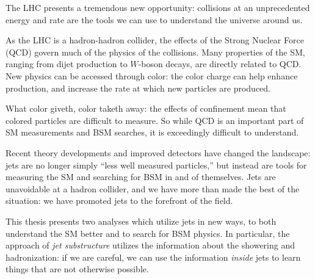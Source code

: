 \label{chapter:introduction}


The LHC presents a tremendous new opportunity: collisions at an unprecedented energy and rate are the tools we can use to understand the universe around us.

As the LHC is a hadron-hadron collider, the effects of the Strong Nuclear Force (QCD) govern much of the physics of the collisions. Many properties of the SM, ranging from dijet production to $W$-boson decays, are directly related to QCD. New physics can be accessed through color: the color charge can help enhance production, and increase the rate at which new particles are produced.

What color giveth, color taketh away: the effects of confinement mean that colored particles are difficult to measure. So while QCD is an important part of SM measurements and BSM searches, it is exceedingly difficult to understand.

Recent theory developments and improved detectors have changed the landscape: jets are no longer simply ``less well measured particles,'' but instead are tools for measuring the SM and searching for BSM in and of themselves. Jets are unavoidable at a hadron collider, and we have more than made the best of the situation: we have promoted jets to the forefront of the field.

This thesis presents two analyses which utilize jets in new ways, to both understand the SM better and to search for BSM physics. In particular, the approach of \textit{jet substructure} utilizes the information about the showering and hadronization: if we are careful, we can use the information \textit{inside} jets to learn things that are not otherwise possible.
